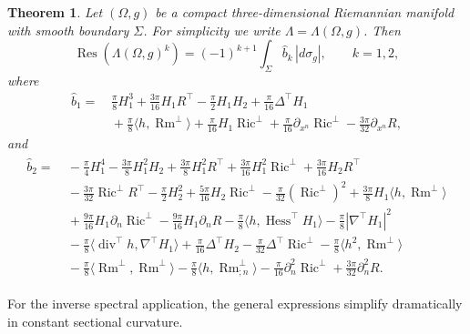 \documentclass[11pt]{amsart}
\newcommand*{\Res}{\operatorname{Res}}
\newcommand{\dvg}{\operatorname{div}}
\newcommand{\Hess}{\operatorname{Hess}}
\newcommand{\Ric}{\operatorname{Ric}}
\newcommand{\Rm}{\operatorname{Rm}}
\newtheorem{theorem}{Theorem}[section]
\theoremstyle{definition}
\numberwithin{equation}{section}
\begin{document}
	\begin{theorem}
		\label{thm: main thm b1 b2}
		Let $(\Omega,g)$ be a compact three-dimensional Riemannian manifold with smooth boundary $\Sigma$. For simplicity we write $\Lambda=\Lambda(\Omega, g)$. Then
		\[
		\Res(\Lambda(\Omega,g)^k)=(-1)^{k+1}\int_\Sigma \widehat b_k\,|d\sigma_g|,
		\qquad k=1,2,
		\]
		where
		\begin{align*}
			\widehat b_1
			= &\, \frac{\pi}{8} H_1^3 + \frac{3\pi}{16}H_1R^\top - \frac{\pi}{2}H_1H_2 + \frac{\pi}{16}\Delta^\top H_1 \\
			&\, + \frac{\pi}{8}\langle h, \Rm^\bot\rangle + \frac{\pi}{16}H_1\Ric^\bot + \frac{\pi}{16}\partial_{x^n}\Ric^\bot - \frac{3\pi}{32}\partial_{x^n}R, 
		\end{align*}
		and
		\begin{align*}
			\begin{aligned}
				\widehat b_2 = &\ -\frac{\pi}{4} H_1^4 - \frac{3\pi}{8} H_1^2 H_2 + \frac{3\pi}{8} H_1^2 R^\top + \frac{3\pi}{16} H_1^2\Ric^\bot + \frac{3\pi}{16} H_2 R^\top \\
				&\ - \frac{3\pi}{32}\Ric^\bot R^\top - \frac{\pi}{2} H_2^2 + \frac{5\pi}{16} H_2\Ric^\bot - \frac{\pi}{32}(\Ric^\bot)^2 + \frac{3\pi}{8} H_1\langle h,\Rm^\bot\rangle\\
				&\ + \frac{9\pi}{16} H_1\partial_n\Ric^\bot - \frac{9\pi}{16} H_1\partial_n R - \frac{\pi}{8}\langle h,\Hess^\top H_1\rangle - \frac{\pi}{8}|\nabla^\top H_1|^2\\
				&\ - \frac{\pi}{8}\langle\dvg^\top h,\nabla^\top H_1\rangle + \frac{\pi}{16}\Delta^\top H_2 - \frac{\pi}{32}\Delta^\top\Ric^\bot - \frac{\pi}{8}\langle h^2,\Rm^\bot\rangle\\
				&\ - \frac{\pi}{8}\langle\Rm^\bot,\Rm^\bot\rangle - \frac{\pi}{8}\langle h,\Rm^\bot_{;n}\rangle - \frac{\pi}{16}\partial_n^2\Ric^\bot + \frac{3\pi}{32}\partial_n^2 R.
			\end{aligned}
		\end{align*} 
	\end{theorem}
	
	
	
	For the inverse spectral application, the general expressions simplify dramatically in constant sectional curvature.
	
\end{document}
